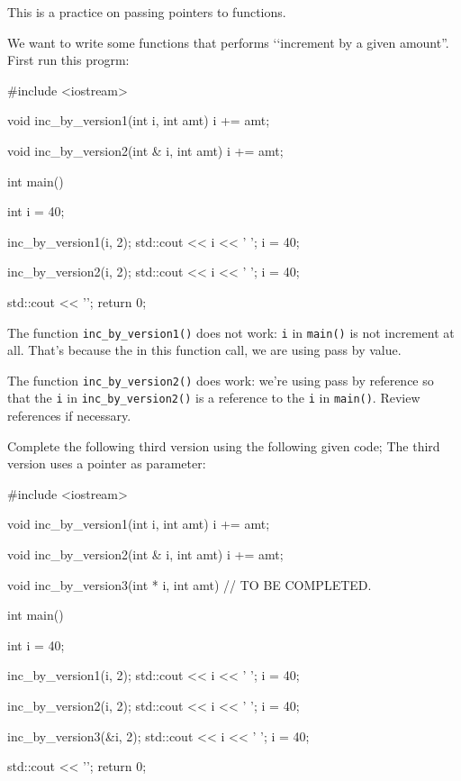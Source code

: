 This is a practice on passing pointers to functions.

We want to write some functions that performs \lq\lq increment by
a given amount''.
First run this progrm:
\begin{console}
#include <iostream>

void inc_by_version1(int i, int amt)
{
    i += amt;
}

void inc_by_version2(int & i, int amt)
{
    i += amt;
}

int main()
{
    int i = 40;

    inc_by_version1(i, 2);
    std::cout << i << ' ';
    i = 40;

    inc_by_version2(i, 2);
    std::cout << i << ' ';
    i = 40;

    std::cout << '\n';
    return 0;
}
\end{console}

The function \verb!inc_by_version1()! does not work:
\verb!i! in \verb!main()! is not increment at all.
That's because the in this function call, we are
using pass by value.

The function \verb!inc_by_version2()! does work:
we're using pass by reference so that the 
\verb!i! in \verb!inc_by_version2()!
is a reference to the \verb!i! in \verb!main()!.
Review references if necessary.

Complete the following third version using the following
given code;
The third version uses a pointer as parameter:

\begin{console}
#include <iostream>

void inc_by_version1(int i, int amt)
{
    i += amt;
}

void inc_by_version2(int & i, int amt)
{
    i += amt;
}

void inc_by_version3(int * i, int amt)
{
    // TO BE COMPLETED.
}

int main()
{
    int i = 40;

    inc_by_version1(i, 2);
    std::cout << i << ' ';
    i = 40;

    inc_by_version2(i, 2);
    std::cout << i << ' ';
    i = 40;

    inc_by_version3(&i, 2);
    std::cout << i << ' ';
    i = 40;

    std::cout << '\n';
    return 0;
}
\end{console}
